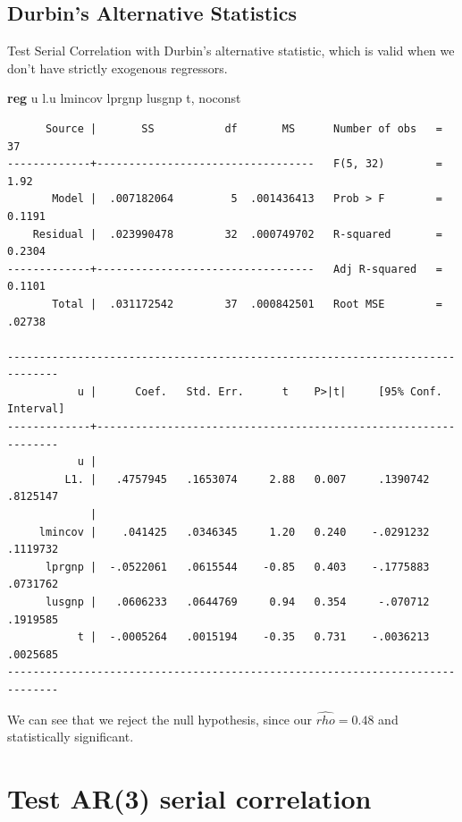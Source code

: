 \documentclass[
]{book}
\newenvironment{Shaded}{\begin{snugshade}}{\end{snugshade}}
\newcommand{\KeywordTok}[1]{\textcolor[rgb]{0.13,0.29,0.53}{\textbf{#1}}}
\newcommand{\NormalTok}[1]{#1}
\newcommand{\OtherTok}[1]{\textcolor[rgb]{0.56,0.35,0.01}{#1}}
\begin{document}
\subsection*{Durbin's Alternative Statistics}\label{durbins-alternative-statistics}

Test Serial Correlation with Durbin's alternative statistic, which is valid when
we don't have strictly exogenous regressors.

\begin{Shaded}
\begin{Highlighting}[]
\KeywordTok{reg}\NormalTok{ u }\OtherTok{l}\NormalTok{.u lmincov lprgnp lusgnp t, noconst }
\end{Highlighting}
\end{Shaded}

\begin{verbatim}
      Source |       SS           df       MS      Number of obs   =        37
-------------+----------------------------------   F(5, 32)        =      1.92
       Model |  .007182064         5  .001436413   Prob > F        =    0.1191
    Residual |  .023990478        32  .000749702   R-squared       =    0.2304
-------------+----------------------------------   Adj R-squared   =    0.1101
       Total |  .031172542        37  .000842501   Root MSE        =    .02738

------------------------------------------------------------------------------
           u |      Coef.   Std. Err.      t    P>|t|     [95% Conf. Interval]
-------------+----------------------------------------------------------------
           u |
         L1. |   .4757945   .1653074     2.88   0.007     .1390742    .8125147
             |
     lmincov |    .041425   .0346345     1.20   0.240    -.0291232    .1119732
      lprgnp |  -.0522061   .0615544    -0.85   0.403    -.1775883    .0731762
      lusgnp |   .0606233   .0644769     0.94   0.354     -.070712    .1919585
           t |  -.0005264   .0015194    -0.35   0.731    -.0036213    .0025685
------------------------------------------------------------------------------
\end{verbatim}

We can see that we reject the null hypothesis, since our \(\hat{rho} = 0.48\) and
statistically significant.

\section{Test AR(3) serial correlation}\label{test-ar3-serial-correlation}
\end{document}
